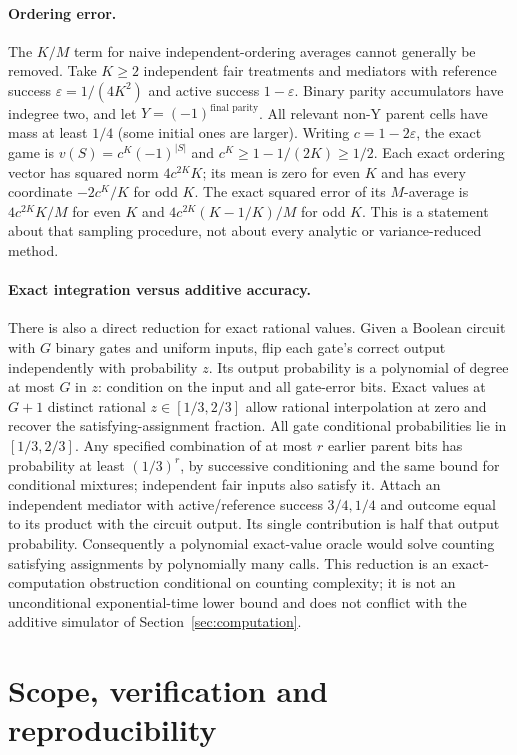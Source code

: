 \documentclass[11pt,a4paper]{article}
\numberwithin{equation}{section}
\theoremstyle{definition}
\begin{document}
\paragraph{Ordering error.}
The $K/M$ term for naive independent-ordering averages cannot generally
be removed. Take $K\ge2$ independent fair treatments and mediators with
reference success $\varepsilon=1/(4K^2)$ and active success
$1-\varepsilon$. Binary parity accumulators have indegree two, and let
$Y=(-1)^{\text{final parity}}$. All relevant non-Y parent cells have
mass at least $1/4$ (some initial ones are larger). Writing
$c=1-2\varepsilon$, the exact game is $v(S)=c^K(-1)^{|S|}$ and
$c^K\ge1-1/(2K)\ge1/2$. Each exact ordering vector has squared norm
$4c^{2K}K$; its mean is zero for even $K$ and has every coordinate
$-2c^K/K$ for odd $K$. The exact squared error of its $M$-average is
$4c^{2K}K/M$ for even $K$ and
$4c^{2K}(K-1/K)/M$ for odd $K$. This is a statement about that
sampling procedure, not about every analytic or variance-reduced method.

\paragraph{Exact integration versus additive accuracy.}
There is also a direct reduction for exact rational values. Given a
Boolean circuit with $G$ binary gates and uniform inputs, flip each gate's
correct output independently with probability $z$. Its output probability
is a polynomial of degree at most $G$ in $z$: condition on the input and
all gate-error bits. Exact values at $G+1$ distinct rational
$z\in[1/3,2/3]$ allow rational interpolation at zero and recover the
satisfying-assignment fraction. All gate conditional probabilities lie
in $[1/3,2/3]$. Any specified combination of at most $r$ earlier parent
bits has probability at least $(1/3)^r$, by successive conditioning
and the same bound for conditional mixtures; independent fair inputs
also satisfy it. Attach an independent mediator with active/reference
success $3/4,1/4$ and outcome equal to its product with the circuit
output. Its single contribution is half that output probability.
Consequently a polynomial exact-value oracle would solve counting
satisfying assignments by polynomially many calls. This reduction is
an exact-computation obstruction conditional on counting complexity;
it is not an unconditional exponential-time lower bound and does not
conflict with the additive simulator of Section~\ref{sec:computation}.

\section{Scope, verification and reproducibility}\label{sec:verification}
\end{document}
